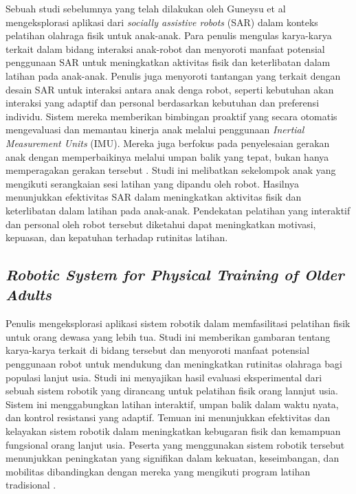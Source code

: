 Sebuah studi sebelumnya yang telah dilakukan oleh Guneysu et al mengeksplorasi aplikasi dari \emph{socially assistive robots} (SAR) dalam konteks pelatihan olahraga fisik untuk anak-anak.
Para penulis mengulas karya-karya terkait dalam bidang interaksi anak-robot dan menyoroti manfaat potensial penggunaan SAR untuk meningkatkan aktivitas fisik dan keterlibatan dalam latihan pada anak-anak.
Penulis juga menyoroti tantangan yang terkait dengan desain SAR untuk interaksi antara anak denga robot, seperti kebutuhan akan interaksi yang adaptif dan personal berdasarkan kebutuhan dan preferensi individu.
Sistem mereka memberikan bimbingan proaktif yang secara otomatis mengevaluasi dan memantau kinerja anak melalui penggunaan \emph{Inertial Measurement Units} (IMU).
Mereka juga berfokus pada penyelesaian gerakan anak dengan memperbaikinya melalui umpan balik yang tepat, bukan hanya memperagakan gerakan tersebut \parencite{güneysu2017}.
Studi ini melibatkan sekelompok anak yang mengikuti serangkaian sesi latihan yang dipandu oleh robot. Hasilnya menunjukkan efektivitas SAR dalam meningkatkan aktivitas fisik dan keterlibatan dalam latihan pada anak-anak.
Pendekatan pelatihan yang interaktif dan personal oleh robot tersebut diketahui dapat meningkatkan motivasi, kepuasan, dan kepatuhan terhadap rutinitas latihan.

\subsection{\emph{Robotic System for Physical Training of Older Adults}}
\label{subsec:sars-for-adults}

Penulis mengeksplorasi aplikasi sistem robotik dalam memfasilitasi pelatihan fisik untuk orang dewasa yang lebih tua. Studi ini memberikan gambaran tentang karya-karya terkait di bidang tersebut dan menyoroti manfaat potensial penggunaan robot untuk mendukung dan meningkatkan rutinitas olahraga bagi populasi lanjut usia.
Studi ini menyajikan hasil evaluasi eksperimental dari sebuah sistem robotik yang dirancang untuk pelatihan fisik orang lannjut usia. Sistem ini menggabungkan latihan interaktif, umpan balik dalam waktu nyata, dan kontrol resistansi yang adaptif. Temuan ini menunjukkan efektivitas dan kelayakan sistem robotik dalam meningkatkan kebugaran fisik dan kemampuan fungsional orang lanjut usia.
Peserta yang menggunakan sistem robotik tersebut menunjukkan peningkatan yang signifikan dalam kekuatan, keseimbangan, dan mobilitas dibandingkan dengan mereka yang mengikuti program latihan tradisional \parencite{avioz2021}.

